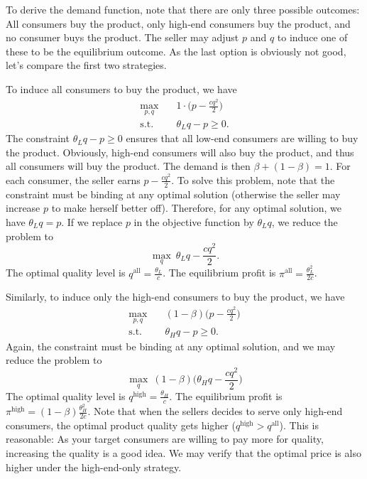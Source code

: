 \documentclass[11pt,a4paper]{article}
\begin{document}
To derive the demand function, note that there are only three possible outcomes: 
All consumers buy the product, only high-end consumers buy the product, 
and no consumer buys the product. The seller may adjust $p$ and $q$ to induce
one of these to be the equilibrium outcome. As the last option is obviously not good, 
let's compare the first two strategies. 

To induce all consumers to buy the product, we have 
\[\begin{split}
	\max_{p, q} \quad & 1 \cdot \bigg(p - \frac{cq^2}{2}\bigg) \\
	\mbox{s.t.} \quad & \theta_L q - p \geq 0.
\end{split}\]
The constraint $\theta_L q - p \geq 0$ ensures that all low-end consumers 
are willing to buy the product. Obviously, high-end consumers will also 
buy the product, and thus all consumers will buy the product. 
The demand is then $\beta + (1 - \beta) = 1$. 
For each consumer, the seller earns $p - \frac{cq^2}{2}$. 
To solve this problem, note that the constraint must be binding at 
any optimal solution (otherwise the seller may increase $p$ to make herself better
off). Therefore, for any optimal solution, we have $\theta_L q = p$. 
If we replace $p$ in the objective function by $\theta_L q$, 
we reduce the problem to 
\[
	\max_q \ \theta_L q - \frac{cq^2}{2}. 
\]
The optimal quality level is $q^{\mathrm{all}} = \frac{\theta_L}{c}$. The equilibrium 
profit is $\pi^{\mathrm{all}} = \frac{\theta_L^2}{2c}$. 

Similarly, to induce only the high-end consumers to buy the product, we have 
\[\begin{split}
	\max_{p, q} \quad & (1 - \beta) \bigg(p - \frac{cq^2}{2}\bigg) \\
	\mbox{s.t.} \quad & \theta_H q - p \geq 0.
\end{split}\]
Again, the constraint must be binding at 
any optimal solution, and we may reduce the problem to 
\[
	\max_q \ (1 - \beta) \bigg(\theta_H q - \frac{cq^2}{2}\bigg)
\]
The optimal quality level is $q^{\mathrm{high}} = \frac{\theta_H}{c}$. The equilibrium 
profit is $\pi^{\mathrm{high}} = (1 - \beta)\frac{\theta_H^2}{2c}$. 
Note that when the sellers decides to serve only high-end consumers, 
the optimal product quality gets higher ($q^{\mathrm{high}} > q^{\mathrm{all}}$). 
This is reasonable: As your target consumers are willing to pay more for quality, 
increasing the quality is a good idea. We may verify that the optimal price
is also higher under the high-end-only strategy. 
\end{document}
